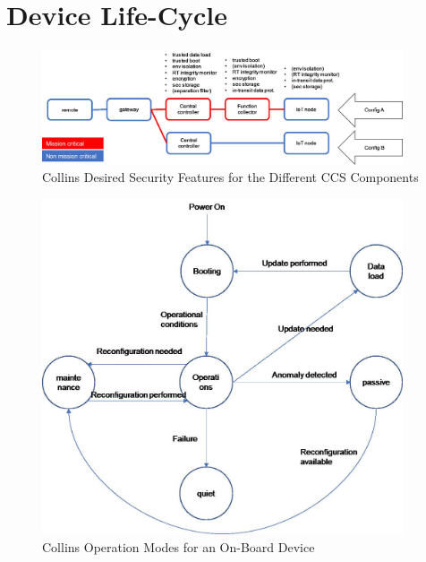 \chapter{Device Life-Cycle}

\begin{figure}
  \begin{center}
    \includegraphics[width=0.95\textwidth]{figures/collins-sec-feat.jpg}
  \end{center}
  \caption{Collins Desired Security Features for the Different CCS Components}
  \label{fig:collins-sec-feat}
\end{figure}

\begin{figure}
  \begin{center}
    \includegraphics[width=0.95\textwidth]{figures/collins-opmodes.jpg}
  \end{center}
  \caption{Collins Operation Modes for an On-Board Device}
  \label{fig:collins-opmodes}
\end{figure}

